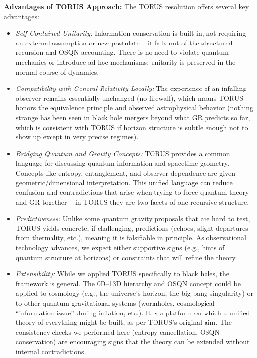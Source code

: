 \documentclass[]{article}
\begin{document}
\textbf{Advantages of TORUS Approach:} The TORUS resolution offers
several key advantages:

\begin{itemize}
\item
  \emph{Self-Contained Unitarity:} Information conservation is built-in,
  not requiring an external assumption or new postulate -- it falls out
  of the structured recursion and OSQN accounting. There is no need to
  violate quantum mechanics or introduce ad hoc mechanisms; unitarity is
  preserved in the normal course of dynamics.
\item
  \emph{Compatibility with General Relativity Locally:} The experience
  of an infalling observer remains essentially unchanged (no firewall),
  which means TORUS honors the equivalence principle and observed
  astrophysical behavior (nothing strange has been seen in black hole
  mergers beyond what GR predicts so far, which is consistent with TORUS
  if horizon structure is subtle enough not to show up except in very
  precise regimes).
\item
  \emph{Bridging Quantum and Gravity Concepts:} TORUS provides a common
  language for discussing quantum information and spacetime geometry.
  Concepts like entropy, entanglement, and observer-dependence are given
  geometric/dimensional interpretation. This unified language can reduce
  confusion and contradictions that arise when trying to force quantum
  theory and GR together -- in TORUS they are two facets of one
  recursive structure.
\item
  \emph{Predictiveness:} Unlike some quantum gravity proposals that are
  hard to test, TORUS yields concrete, if challenging, predictions
  (echoes, slight departures from thermality, etc.), meaning it is
  falsifiable in principle. As observational technology advances, we
  expect either supportive signs (e.g., hints of quantum structure at
  horizons) or constraints that will refine the theory.
\item
  \emph{Extensibility:} While we applied TORUS specifically to black
  holes, the framework is general. The 0D--13D hierarchy and OSQN
  concept could be applied to cosmology (e.g., the universe's horizon,
  the big bang singularity) or to other quantum gravitational systems
  (wormholes, cosmological ``information issue'' during inflation,
  etc.). It is a platform on which a unified theory of everything might
  be built, as per TORUS's original aim. The consistency checks we
  performed here (entropy cancellation, OSQN conservation) are
  encouraging signs that the theory can be extended without internal
  contradictions.
\end{itemize}
\end{document}
